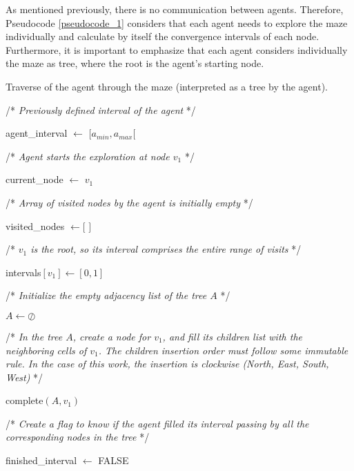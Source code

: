 As mentioned previously, there is no communication between agents. Therefore, Pseudocode \ref{pseudocode_1} considers that each agent needs to explore the maze individually and calculate by itself the convergence intervals of each node. Furthermore, it is important to emphasize that each agent considers individually the maze as tree, where the root is the agent's starting node.

\begin{algorithm}
\caption{Traverse of the agent through the maze (interpreted as a tree by the agent).}
\label{pseudocode_1}
\begin{algorithmic}%
\State /* \textit{Previously defined interval of the agent} */

\State agent\_interval $\gets$ $[a_{min},a_{max}[$

\State

\State /* \textit{Agent starts the exploration at node $v_{1}$} */

\State current\_node $\gets$ $v_{1}$

\State

\State /* \textit{Array of visited nodes by the agent is initially empty} */

\State visited\_nodes $\gets [$ $ ]$

\State

\State /* \textit{$v_{1}$ is the root, so its interval comprises the entire range of visits} */

\State intervals$[v_{1}] \gets [0,1]$

\State

\State /* \textit{Initialize the empty adjacency list of the tree $A$} */

\State $A \gets \oslash$

\State

\State /* \textit{In the tree $A$, create a node for $v_{1}$, and fill its children list with the neighboring cells of $v_{1}$. The children insertion order must follow some immutable rule. In the case of this work, the insertion is clockwise (North, East, South, West)} */

\State complete$(A, v_{1})$

\State

\State /* \textit{Create a flag to know if the agent filled its interval passing by all the corresponding nodes in the tree} */

\State finished\_interval $\gets$ FALSE

\State

\State


\end{algorithmic}
\end{algorithm}
